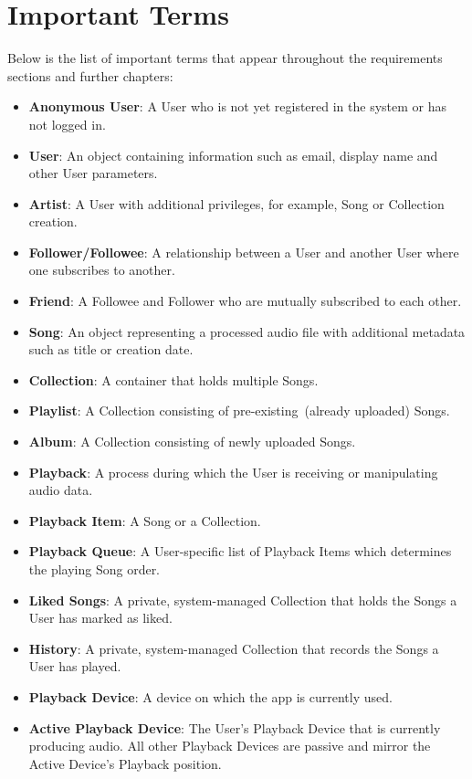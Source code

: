 \section{Important Terms}
Below is the list of important terms that appear throughout the requirements sections and further chapters:
\begin{itemize}
    \item \textbf{Anonymous User}: A User who is not yet registered in the system or has not logged in.
    \item \textbf{User}: An object containing information such as email, display name and other User parameters.
    \item \textbf{Artist}: A User with additional privileges, for example, Song or Collection creation.
    \item \textbf{Follower/Followee}: A relationship between a User and another User where one subscribes to another.
    \item \textbf{Friend}: A Followee and Follower who are mutually subscribed to each other.
    \item \textbf{Song}: An object representing a processed audio
    file with additional metadata such as title or creation date.
    \item \textbf{Collection}: A container that holds multiple Songs.
    \item \textbf{Playlist}: A Collection consisting of pre-existing~(already uploaded) Songs.
    \item \textbf{Album}: A Collection consisting of newly uploaded Songs.
    \item \textbf{Playback}: A process during which the User is receiving or manipulating audio data.
    \item \textbf{Playback Item}: A Song or a Collection.
    \item \textbf{Playback Queue}: A User-specific list of Playback Items which determines the playing Song order.
    \item \textbf{Liked Songs}: A private, system-managed Collection that holds the Songs a User has marked as liked.
    \item \textbf{History}: A private, system-managed Collection that records the Songs a User has played.
    \item \textbf{Playback Device}: A device on which the app is currently used.
    \item \textbf{Active Playback Device}: The User's Playback Device that is currently producing audio.
    All other Playback Devices are passive and mirror the Active Device's Playback position.

\end{itemize}
